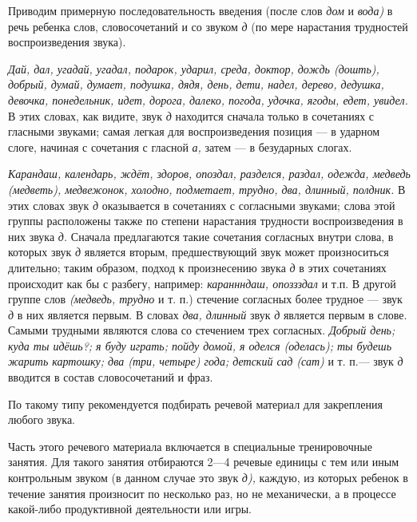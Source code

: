 \documentclass[a5paper]{book}
\renewcommand{\emph}[1]{\textit{#1}}
\begin{document}
Приводим примерную последовательность введения (после слов \emph{дом} и
\emph{вода)} в речь ребенка слов, словосочетаний и со звуком \emph{д}
(по мере нарастания трудностей воспроизведения звука).

\emph{Дай, дал, угадай, угадал, подарок, ударил, среда, доктор, дождь
(дошть), добрый, думай, думает, подушка, дядя, день, дети, надел,
дерево, дедушка, девочка, понедельник, идет, дорога, далеко, погода,
удочка, ягоды, едет, увидел.} В этих словах, как видите, звук \emph{д}
находится сначала только в сочетаниях с гласными звуками; самая легкая
для воспроизведения позиция --- в ударном слоге, начиная с сочетания с
гласной \emph{а,} затем --- в безударных слогах.

\emph{Карандаш, календарь, ждёт, здоров, опоздал, разделся, раздал,
одежда, медведь (медветь), медвежонок, холодно, подметает, трудно, два,
длинный, полдник.} В этих словах звук \emph{д} оказывается в сочетаниях
с согласными звуками; слова этой группы расположены также по степени
нарастания трудности воспроизведения в них звука \emph{д.} Сначала
предлагаются такие сочетания согласных внутри слова, в которых звук
\emph{д} является вторым, предшествующий звук может произноситься
длительно; таким образом, подход к произнесению звука \emph{д} в этих
сочетаниях происходит как бы с разбегу, например: \emph{караннндаш,
опоззздал} и т.п. В другой группе слов \emph{(медведь, трудно} и т. п.)
стечение согласных более трудное --- звук \emph{д} в них является
первым. В словах \emph{два, длинный} звук \emph{д} является первым в
слове. Самыми трудными являются слова со стечением трех согласных.
\emph{Добрый день; куда ты идёшь?; я буду играть; пойду домой, я оделся
(оделась); ты будешь жарить картошку; два (три, четыре) года; детский
сад (сат)} и т. п.--- звук \emph{д} вводится в состав словосочетаний и
фраз.

По такому типу рекомендуется подбирать речевой материал для закрепления
любого звука.

Часть этого речевого материала включается в специальные тренировочные
занятия. Для такого занятия отбираются 2---4 речевые единицы с тем или
иным контрольным звуком (в данном случае это звук \emph{д),} каждую, из
которых ребенок в течение занятия произносит по несколько раз, но не
механически, а в процессе какой-либо продуктивной деятельности или игры.
\end{document}
